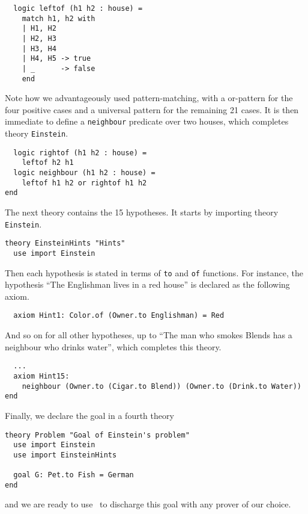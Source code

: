 \begin{verbatim}
  logic leftof (h1 h2 : house) =
    match h1, h2 with
    | H1, H2 
    | H2, H3 
    | H3, H4 
    | H4, H5 -> true
    | _      -> false
    end
\end{verbatim}
Note how we advantageously used pattern-matching, with a or-pattern
for the four positive cases and a universal pattern for the remaining
21 cases. It is then immediate to define a \texttt{neighbour}
predicate over two houses, which completes theory \texttt{Einstein}.
\begin{verbatim}
  logic rightof (h1 h2 : house) =
    leftof h2 h1
  logic neighbour (h1 h2 : house) =
    leftof h1 h2 or rightof h1 h2
end
\end{verbatim}

The next theory contains the 15 hypotheses. It starts by importing
theory \texttt{Einstein}.
\begin{verbatim}
theory EinsteinHints "Hints"
  use import Einstein
\end{verbatim}
Then each hypothesis is stated in terms of \texttt{to} and \texttt{of}
functions. For instance, the hypothesis ``The Englishman lives in a
red house'' is declared as the following axiom.
\begin{verbatim}
  axiom Hint1: Color.of (Owner.to Englishman) = Red
\end{verbatim}
And so on for all other hypotheses, up to
``The man who smokes Blends has a neighbour who drinks water'', which completes
this theory.
\begin{verbatim}
  ...
  axiom Hint15:
    neighbour (Owner.to (Cigar.to Blend)) (Owner.to (Drink.to Water))
end
\end{verbatim}
Finally, we declare the goal in a fourth theory
\begin{verbatim}
theory Problem "Goal of Einstein's problem"
  use import Einstein
  use import EinsteinHints

  goal G: Pet.to Fish = German
end
\end{verbatim}
and we are ready to use \why\ to discharge this goal with any prover
of our choice.

